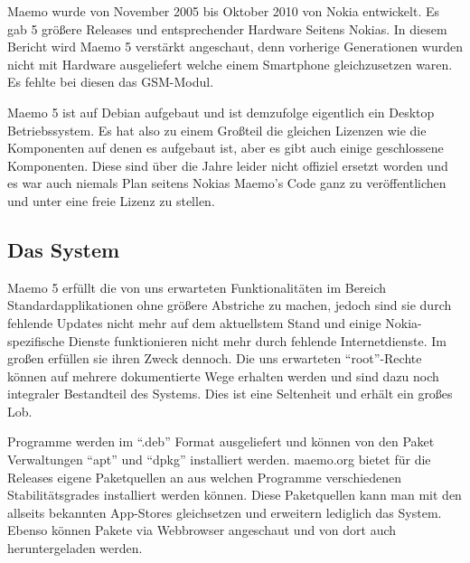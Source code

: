 Maemo wurde von November 2005\thinspace\cite{online:maemo1-770} bis Oktober 2010\thinspace\cite{online:maemo5-n900} von Nokia  entwickelt. Es gab 5 größere Releases und entsprechender Hardware Seitens Nokias\thinspace\cite{online:maemo1-770}\thinspace\cite{online:n800-specs}\thinspace\cite{online:n810-specs}\thinspace\cite{online:n900-specs}. In diesem Bericht wird Maemo 5 verstärkt angeschaut, denn vorherige Generationen wurden nicht mit Hardware ausgeliefert welche einem Smartphone gleichzusetzen waren. Es fehlte bei diesen das GSM-Modul.

Maemo 5 ist auf Debian aufgebaut\thinspace\cite{online:maemo-about} und ist demzufolge eigentlich ein Desktop Betriebssystem. Es hat also zu einem Großteil die gleichen Lizenzen wie die Komponenten auf denen es aufgebaut ist, aber es gibt auch einige geschlossene Komponenten\thinspace\cite{online:maemo5-components}. Diese sind über die Jahre leider nicht offiziel ersetzt worden und es war auch niemals Plan seitens Nokias Maemo's Code ganz zu veröffentlichen und unter eine freie Lizenz zu stellen\thinspace\cite{online:maemo-slides}.\\

\subsection{Das System}
Maemo 5 erfüllt die von uns erwarteten Funktionalitäten im Bereich Standardapplikationen ohne größere Abstriche zu machen, jedoch sind sie durch fehlende Updates nicht mehr auf dem aktuellstem Stand und einige Nokia-spezifische Dienste funktionieren nicht mehr durch fehlende Internetdienste. Im großen erfüllen sie ihren Zweck dennoch. Die uns erwarteten ``root''-Rechte können auf mehrere dokumentierte Wege erhalten werden und sind dazu noch integraler Bestandteil des Systems\thinspace\cite{online:maemo-root}. Dies ist eine Seltenheit und erhält ein großes Lob.

Programme werden im ``.deb'' Format ausgeliefert und können von den Paket Verwaltungen ``apt'' und ``dpkg'' installiert werden\thinspace\cite{online:maemo-packetinstalling}.
\mbox{maemo.org} bietet für die Releases eigene Paketquellen an aus welchen Programme verschiedenen Stabilitätsgrades installiert werden können\thinspace\cite{online:maemo-extras}. Diese Paketquellen kann man mit den allseits bekannten \mbox{App-Stores} gleichsetzen und erweitern lediglich das System. Ebenso können Pakete via Webbrowser angeschaut und von dort auch heruntergeladen  werden\thinspace\cite{online:maemo-store}\thinspace\cite{online:maemo-rawrepos}.

